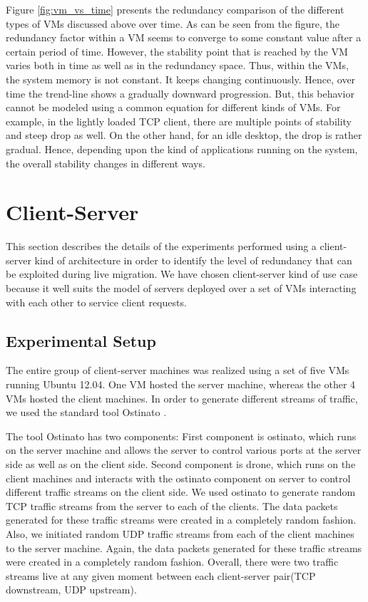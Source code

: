 \documentclass{acm_proc_article-sp}
\begin{document}
Figure \ref{fig:vm_vs_time} presents the redundancy comparison of the different types of VMs discussed above over time. As can be seen from the figure, the redundancy factor within a VM seems to converge to some constant value after a certain period of time. However, the stability point that is reached by the VM varies both in time as well as in the redundancy space. Thus, within the VMs, the system memory is not constant. It keeps changing continuously. Hence, over time the trend-line shows a gradually downward progression. But, this behavior cannot be modeled using a common equation for different kinds of VMs. For example, in the lightly loaded TCP client, there are multiple points of stability and steep drop as well. On the other hand, for an idle desktop, the drop is rather gradual. Hence, depending upon the kind of applications running on the system, the overall stability changes in different ways.

\section{Client-Server}
This section describes the details of the experiments performed using a client-server kind of architecture in order to identify the level of redundancy that can be exploited during live migration. We have chosen client-server kind of use case because it well suits the model of servers deployed over a set of VMs interacting with each other to service client requests.

\subsection{Experimental Setup}
The entire group of client-server machines was realized using a set of five VMs running Ubuntu 12.04. One VM hosted the server machine, whereas the other 4 VMs hosted the client machines. In order to generate different streams of traffic, we used the standard tool Ostinato \cite{ostinato}.

The tool Ostinato has two components: First component is ostinato, which runs on the server machine and allows the server to control various ports at the server side as well as on the client side. Second component is drone, which runs on the client machines and interacts with the ostinato component on server to control different traffic streams on the client side. We used ostinato to generate random TCP traffic streams from the server to each of the clients. The data packets generated for these traffic streams were created in a completely random fashion. Also, we initiated random UDP traffic streams from each of the client machines to the server machine. Again, the data packets generated for these traffic streams were created in a completely random fashion. Overall, there were two traffic streams live at any given moment between each client-server pair(TCP downstream, UDP upstream).
\end{document}
